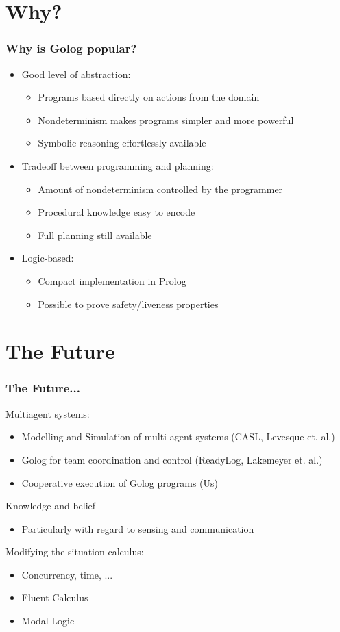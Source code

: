 \documentclass{beamer}
\begin{document}
\section{Why?}
\begin{frame}
\frametitle{Why is Golog popular?}
\begin{itemize}
  \item Good level of abstraction:
  \begin{itemize}
    \item Programs based directly on actions from the domain
    \item Nondeterminism makes programs simpler and more powerful
    \item Symbolic reasoning effortlessly available
  \end{itemize}
  \item Tradeoff between programming and planning:
  \begin{itemize}
    \item Amount of nondeterminism controlled by the programmer
    \item Procedural knowledge easy to encode
    \item Full planning still available
  \end{itemize}
  \item Logic-based:
  \begin{itemize}
    \item Compact implementation in Prolog
    \item Possible to prove safety/liveness properties
  \end{itemize}
\end{itemize}
\end{frame}


\section{The Future}
\begin{frame}
\frametitle{The Future...}
Multiagent systems:
\begin{itemize}
  \item Modelling and Simulation of multi-agent systems (CASL, Levesque et. al.)
  \item Golog for team coordination and control (ReadyLog, Lakemeyer et. al.)
  \item Cooperative execution of Golog programs (Us)
\end{itemize}

Knowledge and belief
\begin{itemize}
  \item Particularly with regard to sensing and communication
\end{itemize}

Modifying the situation calculus:
\begin{itemize}
  \item Concurrency, time, ...
  \item Fluent Calculus
  \item Modal Logic
\end{itemize}
\end{frame}
\end{document}
